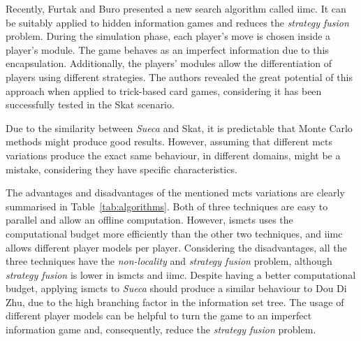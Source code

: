 Recently, Furtak and Buro \cite{Furtak} presented a new search algorithm called \gls{iimc}.
It can be suitably applied to hidden information games and reduces the \emph{strategy fusion} problem.
During the simulation phase, each player's move is chosen inside a player's module.
The game behaves as an imperfect information due to this encapsulation.
Additionally, the players' modules allow the differentiation of players using different strategies.
The authors revealed the great potential of this approach when applied to trick-based card games, considering it has been successfully tested in the Skat scenario.

\bigskip

Due to the similarity between \emph{Sueca} and Skat, it is predictable that Monte Carlo methods might produce good results.
However, assuming that different \gls{mcts} variations produce the exact same behaviour, in different domains, might be a mistake, considering they have specific characteristics.

The advantages and disadvantages of the mentioned \gls{mcts} variations are clearly summarised in Table~\ref{tab:algorithms}.
Both of three techniques are easy to parallel and allow an offline computation. However, \gls{ismcts} uses the computational budget more efficiently than the other two techniques, and \gls{iimc} allows different player models per player.
Considering the disadvantages, all the three techniques have the \emph{non-locality} and \emph{strategy fusion} problem, although \emph{strategy fusion} is lower in \gls{ismcts} and \gls{iimc}.
Despite having a better computational budget, applying \gls{ismcts} to \emph{Sueca} should produce a similar behaviour to Dou Di Zhu, due to the high branching factor in the information set tree.
The usage of different player models can be helpful to turn the game to an imperfect information game and, consequently, reduce the \emph{strategy fusion} problem.


